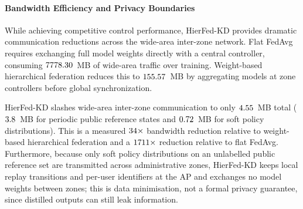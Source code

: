 \paragraph{Bandwidth Efficiency and Privacy Boundaries} 
While achieving competitive control performance, HierFed-KD provides dramatic communication reductions across the wide-area inter-zone network. Flat FedAvg requires exchanging full model weights directly with a central controller, consuming $7778.30$~MB of wide-area traffic over training. Weight-based hierarchical federation reduces this to $155.57$~MB by aggregating models at zone controllers before global synchronization.

HierFed-KD slashes wide-area inter-zone communication to only $4.55$~MB total ($3.8$~MB for periodic public reference states and $0.72$~MB for soft policy distributions). This is a measured $34\times$ bandwidth reduction relative to weight-based hierarchical federation and a $1711\times$ reduction relative to flat FedAvg. Furthermore, because only soft policy distributions on an unlabelled public reference set are transmitted across administrative zones, HierFed-KD keeps local replay transitions and per-user identifiers at the AP and exchanges no model weights between zones; this is data minimisation, not a formal privacy guarantee, since distilled outputs can still leak information.
